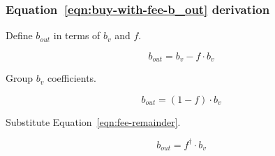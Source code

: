 \subsubsection{Equation~\ref{eqn:buy-with-fee-b_out} derivation}%
\label{sssec:equation-eqn-buy-with-fee-b-out-derivation}

Define $b_{out}$ in terms of $b_v$ and $f$.

\begin{equation*}
	b_{out} = b_v - f \cdot b_v
\end{equation*}

Group $b_v$ coefficients.

\begin{equation*}
	b_{out} = (1 - f) \cdot b_v
\end{equation*}

Substitute Equation~\ref{eqn:fee-remainder}.

\begin{equation*}
	b_{out} = f^{\dagger} \cdot b_v
\end{equation*}
